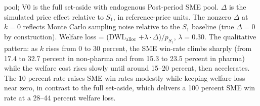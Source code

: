 \begin{table}[!htbp]
\begin{threeparttable}
\begin{tablenotes}
pool; V0 is the full set-aside with endogenous Post-period SME pool.
$\Delta$ is the simulated price effect relative to $S_1$, in
reference-price units. The nonzero $\Delta$ at $k = 0$ reflects
Monte Carlo sampling noise relative to the $S_1$ baseline (true
$\Delta = 0$ by construction). Welfare loss = (DWL$_{\text{alloc}}$
$+ \lambda \cdot \Delta$)$/p_{S_1}$, $\lambda = 0.30$. The
qualitative pattern: as $k$ rises from 0 to 30 percent, the SME
win-rate climbs sharply (from 17.4 to 32.7 percent in non-pharma
and from 15.3 to 23.5 percent in pharma) while the welfare cost
rises slowly until around 15--20 percent, then accelerates. The
10 percent rate raises SME win rates modestly while keeping
welfare loss near zero, in contrast to the full set-aside, which
delivers a 100 percent SME win rate at a 28--44 percent welfare
loss.
\end{tablenotes}
\end{threeparttable}
\end{table}
